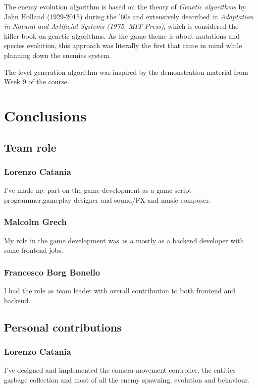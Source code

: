 \documentclass[11pt]{article}
\begin{document}
The enemy evolution algorithm is based on the theory of \textit{Genetic algorithms} by John Holland (1929-2015) during the '60s and extensively described in \textit{Adaptation in Natural and Artificial Systems (1975, MIT Press)}, which is considered the killer book on genetic algorithms. As the game theme is about mutations and species evolution, this approach was literally the first that came in mind while planning down the enemies system.

The level generation algorithm was inspired by the demonstration material from Week 9 of the course.

\section{Conclusions}
\subsection{Team role}
\subsubsection{Lorenzo Catania}
I've made my part on the game development as a game script programmer,gameplay designer and sound/FX and music composer.

\subsubsection{Malcolm Grech}
My role in the game development was as a mostly as a backend developer with some frontend jobs.

\subsubsection{Francesco Borg Bonello}

I had the role as team leader with overall contribution to both frontend and backend.

\subsection{Personal contributions}
\subsubsection{Lorenzo Catania}
I've designed and implemented the camera movement controller, the entities garbage collection and most of all the enemy spawning, evolution and behaviour.
\end{document}
